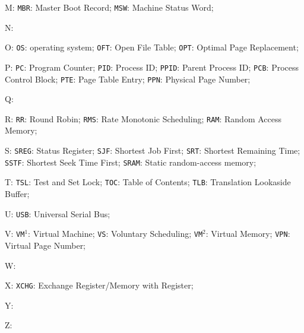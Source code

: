 \documentclass[11pt,a4paper]{article}
\theoremstyle{definition}
\begin{document}
M: \texttt{MBR}: Master Boot Record;  \texttt{MSW}: Machine Status Word;

N:

O: \texttt{OS}: operating system; \texttt{OFT}: Open File Table; \texttt{OPT}: Optimal Page Replacement;

P: \texttt{PC}: Program Counter; \texttt{PID}: Process ID; \texttt{PPID}: Parent Process ID; \texttt{PCB}: Process Control Block; \texttt{PTE}: Page Table Entry; \texttt{PPN}: Physical Page Number;

Q:

R: \texttt{RR}: Round Robin; \texttt{RMS}: Rate Monotonic Scheduling; \texttt{RAM}: Random Access Memory; 

S: \texttt{SREG}: Status Register;
  \texttt{SJF}: Shortest Job First; \texttt{SRT}: Shortest Remaining Time; \texttt{SSTF}: Shortest Seek Time First; \texttt{SRAM}: Static random-access memory;

T: \texttt{TSL}: Test and Set Lock; \texttt{TOC}: Table of Contents; \texttt{TLB}: Translation Lookaside Buffer;

U: \texttt{USB}: Universal Serial Bus;

V: \texttt{VM}$^{1}$: Virtual Machine; \texttt{VS}: Voluntary Scheduling; \texttt{VM}$^{2}$: Virtual Memory; \texttt{VPN}: Virtual Page Number; 

W:

X: \texttt{XCHG}: Exchange Register/Memory with Register;

Y:

Z:



\end{document}
